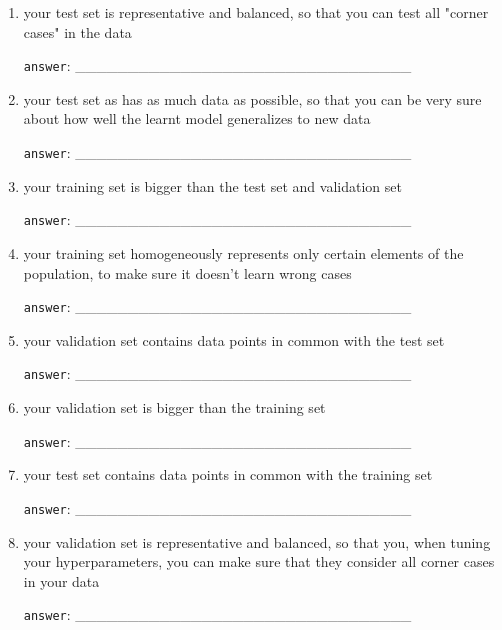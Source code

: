 \documentclass[a4paper,11pt]{scrartcl}
\begin{document}
\begin{enumerate}[label=\alph*)]
\singlespacing%

\item your test set is representative and balanced, so that you can test all
      "corner cases" in the data

\verb|answer|: \_\_\_\_\_\_\_\_\_\_\_\_\_\_\_\_\_\_\_\_\_\_\_\_\_\_\_\_\_\_\_\_

\item your test set as has as much data as possible, so that you can be very
      sure about how well the learnt model generalizes to new data

\verb|answer|: \_\_\_\_\_\_\_\_\_\_\_\_\_\_\_\_\_\_\_\_\_\_\_\_\_\_\_\_\_\_\_\_

\item your training set is bigger than the test set and validation set

\verb|answer|: \_\_\_\_\_\_\_\_\_\_\_\_\_\_\_\_\_\_\_\_\_\_\_\_\_\_\_\_\_\_\_\_

\item your training set homogeneously represents only certain elements of
      the population, to make sure it doesn't learn wrong cases

\verb|answer|: \_\_\_\_\_\_\_\_\_\_\_\_\_\_\_\_\_\_\_\_\_\_\_\_\_\_\_\_\_\_\_\_

\item your validation set contains data points in common with the test set

\verb|answer|: \_\_\_\_\_\_\_\_\_\_\_\_\_\_\_\_\_\_\_\_\_\_\_\_\_\_\_\_\_\_\_\_

\item your validation set is bigger than the training set

\verb|answer|: \_\_\_\_\_\_\_\_\_\_\_\_\_\_\_\_\_\_\_\_\_\_\_\_\_\_\_\_\_\_\_\_

\item your test set contains data points in common with the training set

\verb|answer|: \_\_\_\_\_\_\_\_\_\_\_\_\_\_\_\_\_\_\_\_\_\_\_\_\_\_\_\_\_\_\_\_

\item your validation set is representative and balanced, so that you, when
      tuning your hyperparameters, you can make sure that they consider all
      corner cases in your data

\verb|answer|: \_\_\_\_\_\_\_\_\_\_\_\_\_\_\_\_\_\_\_\_\_\_\_\_\_\_\_\_\_\_\_\_


\end{enumerate}
\end{document}
